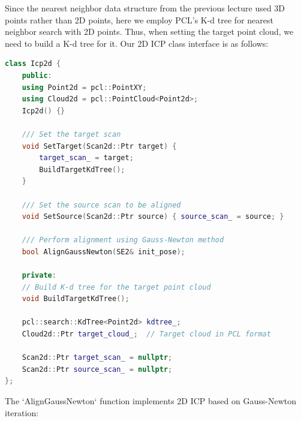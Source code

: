 Since the nearest neighbor data structure from the previous lecture used 3D points rather than 2D points, here we employ PCL's K-d tree for nearest neighbor search with 2D points. Thus, when setting the target point cloud, we need to build a K-d tree for it. Our 2D ICP class interface is as follows:  

\begin{lstlisting}[language=c++,caption=src/ch6/icp\_2d.h]  
class Icp2d {  
	public:  
	using Point2d = pcl::PointXY;  
	using Cloud2d = pcl::PointCloud<Point2d>;  
	Icp2d() {}  
	
	/// Set the target scan  
	void SetTarget(Scan2d::Ptr target) {  
		target_scan_ = target;  
		BuildTargetKdTree();  
	}  
	
	/// Set the source scan to be aligned  
	void SetSource(Scan2d::Ptr source) { source_scan_ = source; }  
	
	/// Perform alignment using Gauss-Newton method  
	bool AlignGaussNewton(SE2& init_pose);  
	
	private:  
	// Build K-d tree for the target point cloud  
	void BuildTargetKdTree();  
	
	pcl::search::KdTree<Point2d> kdtree_;  
	Cloud2d::Ptr target_cloud_;  // Target cloud in PCL format  
	
	Scan2d::Ptr target_scan_ = nullptr;  
	Scan2d::Ptr source_scan_ = nullptr;  
};  
\end{lstlisting}  

The `AlignGaussNewton` function implements 2D ICP based on Gauss-Newton iteration:  

